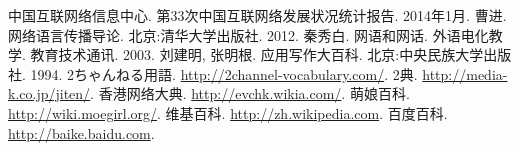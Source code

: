 \begin{thebibliography}{10}
 中国互联网络信息中心. 第33次中国互联网络发展状况统计报告. %
 2014年1月.
 曹进. 网络语言传播导论. 北京:清华大学出版社. 2012.
 秦秀白. 网语和网话. 外语电化教学. 教育技术通讯. 2003.
 刘建明, 张明根. 应用写作大百科. 北京:中央民族大学出版社. 1994.
 {\mincho 2ちゃんねる用語}. \url{http://2channel-vocabulary.com/}.
 {\mincho 2典}. \url{http://media-k.co.jp/jiten/}.
 香港网络大典. \url{http://evchk.wikia.com/}.
 萌娘百科. \url{http://wiki.moegirl.org/}.
 维基百科. \url{http://zh.wikipedia.com}.
 百度百科. \url{http://baike.baidu.com}.
\end{thebibliography}
